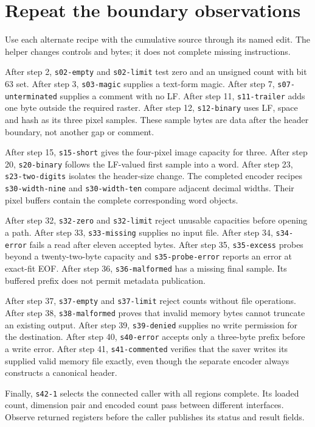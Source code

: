 \section{Repeat the boundary observations}
Use each alternate recipe with the cumulative source through its named edit. The
helper changes controls and bytes; it does not complete missing instructions.

After step 2, \texttt{s02-empty} and \texttt{s02-limit} test zero and an unsigned
count with bit 63 set. After step 3, \texttt{s03-magic} supplies a text-form magic.
After step 7, \texttt{s07-unterminated} supplies a comment with no LF. After step 11,
\texttt{s11-trailer} adds one byte outside the required raster. After step 12,
\texttt{s12-binary} uses LF, space and hash as its three pixel samples. These sample
bytes are data after the header boundary, not another gap or comment.

After step 15, \texttt{s15-short} gives the four-pixel image capacity for three.
After step 20, \texttt{s20-binary} follows the LF-valued first sample into a word.
After step 23, \texttt{s23-two-digits} isolates the header-size change. The completed
encoder recipes \texttt{s30-width-nine} and \texttt{s30-width-ten} compare adjacent
decimal widths. Their pixel buffers contain the complete corresponding word objects.

After step 32, \texttt{s32-zero} and \texttt{s32-limit} reject unusable capacities
before opening a path. After step 33, \texttt{s33-missing} supplies no input file.
After step 34, \texttt{s34-error} fails a read after eleven accepted bytes. After
step 35, \texttt{s35-excess} probes beyond a twenty-two-byte capacity and
\texttt{s35-probe-error} reports an error at exact-fit EOF. After step 36,
\texttt{s36-malformed} has a missing final sample. Its buffered prefix does not
permit metadata publication.

After step 37, \texttt{s37-empty} and \texttt{s37-limit} reject counts without file
operations. After step 38, \texttt{s38-malformed} proves that invalid memory bytes
cannot truncate an existing output. After step 39, \texttt{s39-denied} supplies no
write permission for the destination. After step 40, \texttt{s40-error} accepts
only a three-byte prefix before a write error. After step 41,
\texttt{s41-commented} verifies that the saver writes its supplied valid memory file
exactly, even though the separate encoder always constructs a canonical header.

Finally, \texttt{s42-1} selects the connected caller with all regions complete. Its
loaded count, dimension pair and encoded count pass between different interfaces.
Observe returned registers before the caller publishes its status and result fields.
